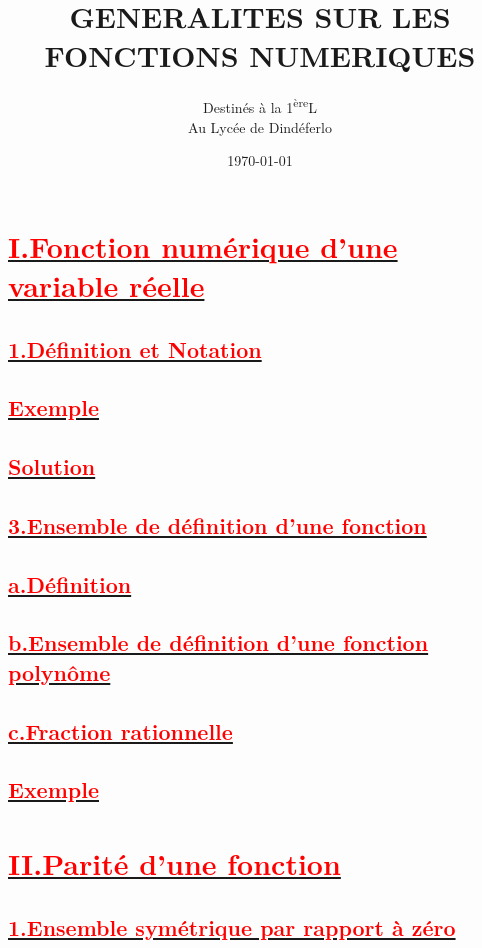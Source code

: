 \documentclass[12pt]{article}
\author{Destinés à la 1\textsuperscript{ère}L\\Au Lycée de Dindéferlo}
\title{\textbf{GENERALITES SUR LES FONCTIONS NUMERIQUES}}
\date{\today}
\begin{document}
\maketitle
\newpage
\section*{\underline{\textbf{\textcolor{red}{I.Fonction numérique d’une variable réelle}}}}
\subsection*{\underline{\textbf{\textcolor{red}{1.Définition et Notation}}}}
\subsection*{\underline{\textbf{\textcolor{red}{Exemple}}}}
\subsection*{\underline{\textbf{\textcolor{red}{Solution}}}}
\subsection*{\underline{\textbf{\textcolor{red}{3.Ensemble de définition d’une fonction}}}}
\subsection*{\underline{\textbf{\textcolor{red}{a.Définition}}}}
\subsection*{\underline{\textbf{\textcolor{red}{b.Ensemble de définition d’une fonction polynôme}}}}
\subsection*{\underline{\textbf{\textcolor{red}{c.Fraction rationnelle}}}}
\subsection*{\underline{\textbf{\textcolor{red}{Exemple}}}}
\section*{\underline{\textbf{\textcolor{red}{II.Parité d’une fonction}}}}
\subsection*{\underline{\textbf{\textcolor{red}{1.Ensemble symétrique par rapport à zéro}}}}
\end{document}
